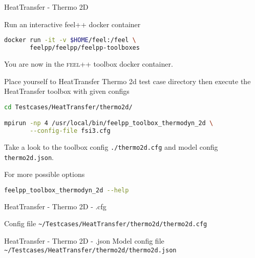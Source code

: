 \begin{frame}{HeatTransfer - Thermo 2D}

Run an interactive feel++ docker container

\begin{lstlisting}[language=Bash,mathescape=false,emph={docker}]
docker run -it -v $HOME/feel:/feel \
       feelpp/feelpp/feelpp-toolboxes
\end{lstlisting}

You are now in the \textsc{feel++} toolbox docker container.

Place yourself to HeatTransfer Thermo 2d test case directory then execute the
HeatTransfer toolbox with given configs

\begin{lstlisting}[language=Bash,mathescape=false, emph={feelpp_toolbox_thermodyn_2d}]
cd Testcases/HeatTransfer/thermo2d/

mpirun -np 4 /usr/local/bin/feelpp_toolbox_thermodyn_2d \
       --config-file fsi3.cfg
\end{lstlisting}

Take a look to the toolbox config \lstinline{./thermo2d.cfg} and model config
\lstinline{thermo2d.json}.

For more possible options
\begin{lstlisting}[language=Bash,mathescape=false, emph={feelpp_toolbox_fsi_2d}]
feelpp_toolbox_thermodyn_2d --help
\end{lstlisting}

\end{frame}


\begin{frame}{HeatTransfer - Thermo 2D - .cfg}

Config file \lstinline{~/Testcases/HeatTransfer/thermo2d/thermo2d.cfg}

\vspace{5mm}


\end{frame}


\begin{frame}{HeatTransfer - Thermo 2D - .json}
Model config file \lstinline{~/Testcases/HeatTransfer/thermo2d/thermo2d.json}
\vspace{5mm}

\end{frame}





